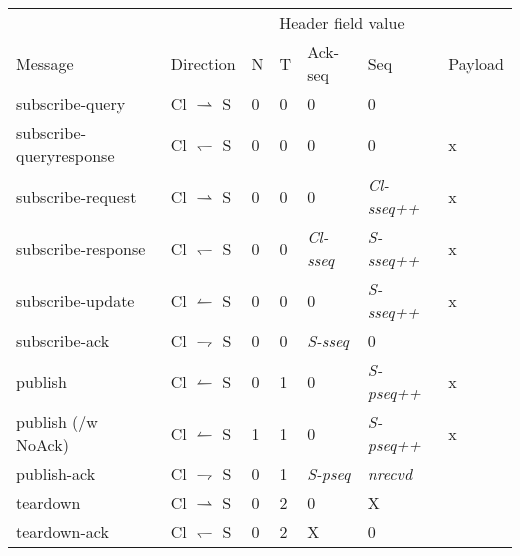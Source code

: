 \begin{tabular}{|l|l|l|l|l|l|l|}
\hline
						& 							& \multicolumn{4}{c|}{Header field value} &	\\
Message					& Direction 				& N	& T	& Ack-seq				& Seq	&	Payload \\
\hline
subscribe-query			& Cl $\rightharpoonup$ S	& 0	& 0 	& 0					& 0	&	\\
\hline
subscribe-queryresponse	& Cl $\leftharpoondown$ S	& 0	& 0		& 0					& 0	&	x \\
\hline
subscribe-request		& Cl $\rightharpoonup$ S	& 0	& 0		& 0					& \emph{Cl-sseq++} & x \\
\hline
subscribe-response		& Cl $\leftharpoondown$ S	& 0	& 0		& \emph{Cl-sseq}	& \emph{S-sseq++} &	 x \\
\hline
subscribe-update		& Cl $\leftharpoonup$ S		& 0	& 0		& 0					& \emph{S-sseq++} &	x \\
\hline
subscribe-ack			& Cl $\rightharpoondown$ S	& 0	& 0		& \emph{S-sseq}		& 0	&	\\
\hline
publish					& Cl $\leftharpoonup$ S		& 0	& 1		& 0					& \emph{S-pseq++} & x \\
\hline
publish	(/w NoAck)      & Cl $\leftharpoonup$ S	& 1	& 1		& 0					& \emph{S-pseq++} & x \\
\hline
publish-ack				& Cl $\rightharpoondown$ S	& 0	& 1		& \emph{S-pseq}		& \emph{nrecvd}	&	\\
\hline
teardown		      	& Cl $\rightharpoonup$ S	& 0	& 2		& 0					& X	& \\
\hline
teardown-ack			& Cl $\leftharpoondown$ S 	& 0 & 2		& X					& 0 &	\\
			
\hline
\end{tabular}